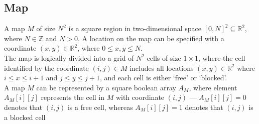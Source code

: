 \documentclass[12pt,notitlepage]{report}
\begin{document}
\subsection{Map}

A map $M$ of size $N^{2}$ is a square region in two-dimensional space $[0,N]^{2} \subseteq \mathbb{R}^{2}$, where $N \in\mathbb{Z}$ and $N > 0$. A location on the map can be specified with a coordinate $(x,y) \in \mathbb{R}^{2}$, where $0 \leq x,y \leq N$.\\

\noindent
The map is logically divided into a grid of $N^{2}$ cells of size $1 \times 1$, where the cell identified by the coordinate $(i,j) \in M$ includes all locations $(x,y) \in \mathbb{R}^{2}$ where $i \leq x \leq i+1$ and $j \leq y \leq j+1$, and each cell is either `free' or `blocked'.\\

\noindent A map $M$ can be represented by a square boolean array $A_{M}$, where element $A_{M}[i][j]$ represents the cell in $M$ with coordinate $(i,j)$ --- $A_{M}[i][j] = 0$ denotes that $(i,j)$ is a free cell, whereas $A_{M}[i][j] = 1$ denotes that $(i,j)$ is a blocked cell
\end{document}
